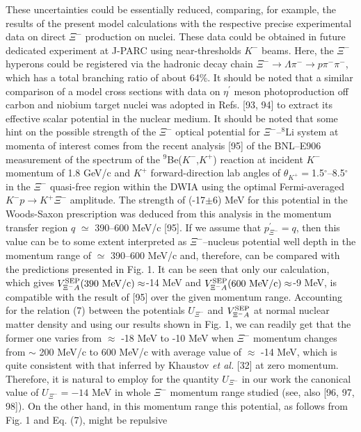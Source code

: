 \documentclass[12pt]{article}
\begin{document}
These uncertainties
could be essentially reduced, comparing, for example, the results of the present model calculations with the
respective precise experimental data on direct $\Xi^-$ production on nuclei. These data could be obtained in
future dedicated experiment at J-PARC using near-thresholds $K^-$ beams. Here, the $\Xi^-$ hyperons could be
registered via the hadronic decay chain $\Xi^- \to {\Lambda}\pi^- \to p{\pi^-}{\pi^-}$, which has a total branching
ratio of about 64\%. It should be noted that a similar comparison of a model cross sections with data on
$\eta^{\prime}$ meson photoproduction off carbon and niobium target nuclei was adopted in Refs. [93, 94] to
extract its effective scalar potential in the nuclear medium. It should be noted that some hint on the possible strength
of the $\Xi^-$ optical potential for $\Xi^-$--$^8$Li system at momenta of interest comes from the recent
analysis [95] of the BNL--E906 measurement of the spectrum of the $^9$Be($K^-$,$K^+$) reaction at incident $K^-$
momentum of 1.8 GeV/c and $K^+$ forward-direction lab angles of $\theta_{K^+}=$1.5$^{\circ}$--8.5$^{\circ}$
in the $\Xi^-$ quasi-free region within the DWIA using the optimal Fermi-averaged $K^-p \to K^+\Xi^-$ amplitude.
The strength of (-17$\pm$6) MeV for this potential in the Woods-Saxon prescription was deduced from this analysis
in the momentum transfer region $q$ $\simeq$ 390--600 MeV/c [95]. If we assume that $p^{\prime}_{\Xi^-}=q$, then this
value can be to some extent interpreted as $\Xi^-$--nucleus potential well depth in the momentum range of
$\simeq$ 390--600 MeV/c and, therefore, can be compared with the predictions presented in Fig. 1. It can be seen
that only our calculation, which gives $V_{{\Xi^-}A}^{\rm SEP}(390~{\rm MeV/c})\approx$-14 MeV and
$V_{{\Xi^-}A}^{\rm SEP}(600~{\rm MeV/c})\approx$-9 MeV, is compatible with the result of [95] over the given
momentum range. Accounting for the relation (7) between the potentials $U_{\Xi^-}$ and $V_{{\Xi^-}A}^{\rm SEP}$
at normal nuclear matter density and using our results shown in Fig. 1, we can readily get that the former one
varies from $\approx$ -18 MeV to -10 MeV when $\Xi^-$ momentum changes from $\sim$ 200 MeV/c to 600 MeV/c with
average value of $\approx$ -14 MeV, which is quite consistent with that inferred by Khaustov {\it et al.} [32]
at zero momentum. Therefore, it is natural to employ for the quantity $U_{\Xi^-}$ in our work the canonical
value of $U_{\Xi^-}=-14$ MeV in whole $\Xi^-$ momentum range studied (see, also [96, 97, 98]).
On the other hand, in this momentum range this potential, as follows from Fig. 1 and Eq. (7), might be repulsive
\end{document}
